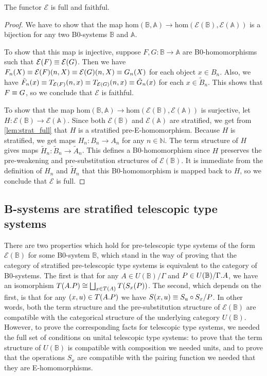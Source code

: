 \begin{thm}
The functor $\mathcal{E}$ is full and faithful.
\end{thm}

\begin{proof}
We have to show that the map $\mathrm{hom}(\mathbb{B},\mathbb{A})\to
\mathrm{hom}(\mathcal{E}(\mathbb{B}),\mathcal{E}(\mathbb{A}))$ is a bijection
for any two B0-systems $\mathbb{B}$ and $\mathbb{A}$.

To show that this map is injective, suppose $F,G:\mathbb{B}\to\mathbb{A}$ are 
B0-homomorphisms such that $\mathcal{E}(F)\equiv\mathcal{E}(G)$. Then we have
$F_n(X)\equiv\mathcal{E}(F)(n,X)\equiv \mathcal{E}(G)(n,X)\equiv G_n(X)$ for each
object $x\in B_n$. Also, we have $\tilde{F}_n(x)\equiv T_{\mathcal{E}(F)}(n,x)
\equiv T_{\mathcal{E}(G)}(n,x)\equiv \tilde{G}_n(x)$ for each
$x\in\tilde{B}_n$. This shows that $F\equiv G$, so we conclude that $\mathcal{E}$
is faithful.  

To show that the map $\mathrm{hom}(\mathbb{B},\mathbb{A})\to
\mathrm{hom}(\mathcal{E}(\mathbb{B}),\mathcal{E}(\mathbb{A}))$ 
is surjective, let $H:\mathcal{E}(\mathbb{B})\to
\mathcal{E}(\mathbb{A})$. Since both $\mathcal{E}(\mathbb{B})$ and
$\mathcal{E}(\mathbb{A})$ are stratified, we get from
\autoref{lem:strat_full} that $H$ is a stratified pre-E-homomorphism. 
Because $H$ is stratified, we get maps $H_n:B_n\to A_n$ for any $n\in\mathbb{N}$.
The term structure of $H$ gives maps $\tilde{H}_n:
\tilde{B}_n\to\tilde{A}_n$. This defines a B0-homomorphism since $H$ 
preserves the pre-weakening and pre-substitution structures of $\mathcal{E}(\mathbb{B})$.
It is immediate from the definition of $H_n$ and
$\tilde{H}_n$ that this B0-homomorphism is mapped back to $H$, so we conclude
that $\mathcal{E}$ is full.
\end{proof}

\subsection{B-systems are stratified telescopic type systems}
There are two properties which hold for pre-telescopic type systems of the form $\mathcal{E}
(\mathbb{B})$ for some B0-system $\mathbb{B}$, 
which stand in the way of proving that the category of stratified
pre-telescopic type systems is equivalent to the category of B0-systems. The first is that
for any $A\in U(\mathbb{B})/\Gamma$ and $P\in U(\mathbb{B})/\ctxext{\Gamma}{A}$,
we have an isomorphism $T(\ctxext{A}{P})\cong\bigsqcup_{x\in T(A)}T(S_x(P))$.
The second, which depends on the first, is that for any $(x,u)\in T(\ctxext{A}{P})$
we have $S(x,u)\equiv S_u\circ S_x/P$. In other words, both the term structure
and the pre-substitution structure of $\mathcal{E}(\mathbb{B})$ are compatible
with the categorical structure of the underlying category $U(\mathbb{B})$.
However, to prove the corresponding facts for telescopic type systems, we needed the full
set of conditions on unital telescopic type systems: to prove that the term structure of
$U(\mathbb{B})$ is compatible with composition we needed units, and to prove 
that the operations $S_x$ are compatible with the pairing function we needed
that they are E-homomorphisms. 

